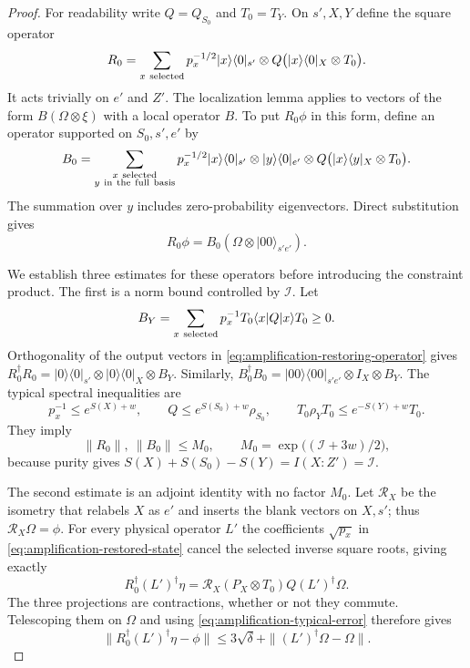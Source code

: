 \begin{proof}
For readability write $Q=Q_{S_0}$ and $T_0=T_Y$.  On $s',X,Y$
define the square operator
\begin{equation}\label{eq:amplification-restoring-operator}
 R_0=\sum_{x\ {\rm selected}}p_x^{-1/2}
 |x\rangle\langle0|_{s'}\otimes
 Q\bigl(|x\rangle\langle0|_X\otimes T_0\bigr).
\end{equation}
It acts trivially on $e'$ and $Z'$.  The localization lemma applies to
vectors of the form $B(\Omega\otimes\xi)$ with a local operator $B$.
To put $R_0\phi$ in this form, define an operator supported on
$S_0,s',e'$ by
\begin{equation}\label{eq:amplification-column-operator}
 B_0=\sum_{\substack{x\ {\rm selected}\\y\ {\rm in\ the\ full\ basis}}}
 p_x^{-1/2}|x\rangle\langle0|_{s'}\otimes
 |y\rangle\langle0|_{e'}\otimes
 Q\bigl(|x\rangle\langle y|_X\otimes T_0\bigr).
\end{equation}
The summation over $y$ includes zero-probability eigenvectors.
Direct substitution gives
\begin{equation}\label{eq:amplification-column-identity}
 R_0\phi=B_0(\Omega\otimes|00\rangle_{s'e'}).
\end{equation}

We establish three estimates for these operators before introducing
the constraint product.  The first is a norm bound controlled by
$\mathcal I$.  Let
\[
 B_Y=\sum_{x\ {\rm selected}}p_x^{-1}
       T_0\langle x|Q|x\rangle T_0\ge0.
\]
Orthogonality of the output vectors in
\eqref{eq:amplification-restoring-operator} gives
$R_0^\dagger R_0=|0\rangle\langle0|_{s'}\otimes
|0\rangle\langle0|_X\otimes B_Y$.
Similarly,
$B_0^\dagger B_0=|00\rangle\langle00|_{s'e'}\otimes
I_X\otimes B_Y$.
The typical spectral inequalities are
\[
 p_x^{-1}\le e^{S(X)+w},\qquad
 Q\le e^{S(S_0)+w}\rho_{S_0},\qquad
 T_0\rho_Y T_0\le e^{-S(Y)+w}T_0.
\]
They imply
\begin{equation}\label{eq:amplification-operator-norm}
 \|R_0\|,\ \|B_0\|\le M_0,\qquad
 M_0=\exp\bigl((\mathcal I+3w)/2\bigr),
\end{equation}
because purity gives
$S(X)+S(S_0)-S(Y)=I(X:Z')=\mathcal I$.

The second estimate is an adjoint identity with no factor $M_0$.
Let $\mathcal R_X$ be the isometry that relabels $X$ as $e'$ and
inserts the blank vectors on $X,s'$; thus $\mathcal R_X\Omega=\phi$.
For every physical operator $L'$ the coefficients $\sqrt{p_x}$
in \eqref{eq:amplification-restored-state} cancel the selected
inverse square roots, giving exactly
\begin{equation}\label{eq:amplification-adjoint-identity}
 R_0^\dagger (L')^\dagger\eta
 =\mathcal R_X(P_X\otimes T_0)Q(L')^\dagger\Omega.
\end{equation}
The three projections are contractions, whether or not they commute.
Telescoping them on $\Omega$ and using
\eqref{eq:amplification-typical-error} therefore gives
\begin{equation}\label{eq:amplification-adjoint-error}
 \|R_0^\dagger(L')^\dagger\eta-\phi\|
 \le3\sqrt\delta+\|(L')^\dagger\Omega-\Omega\|.
\end{equation}


\end{proof}
